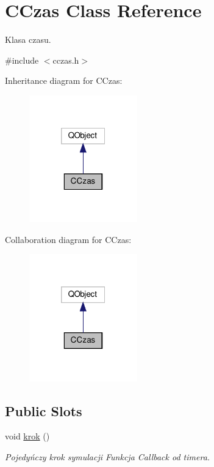 \hypertarget{class_c_czas}{}\section{C\+Czas Class Reference}
\label{class_c_czas}


Klasa czasu.  




{\ttfamily \#include $<$cczas.\+h$>$}



Inheritance diagram for C\+Czas\+:\nopagebreak
\begin{figure}[H]
\begin{center}
\leavevmode
\includegraphics[width=133pt]{class_c_czas__inherit__graph}
\end{center}
\end{figure}


Collaboration diagram for C\+Czas\+:\nopagebreak
\begin{figure}[H]
\begin{center}
\leavevmode
\includegraphics[width=133pt]{class_c_czas__coll__graph}
\end{center}
\end{figure}
\subsection*{Public Slots}
\begin{DoxyCompactItemize}
\item 
\mbox{\label{class_c_czas_af0d9dec535471fd48fee05101ebc6357}} 
void \mbox{\hyperlink{class_c_czas_af0d9dec535471fd48fee05101ebc6357}{krok}} ()
\begin{DoxyCompactList}\small\item\em Pojedyńczy krok symulacji Funkcja Callback od timera. \end{DoxyCompactList}\end{DoxyCompactItemize}
